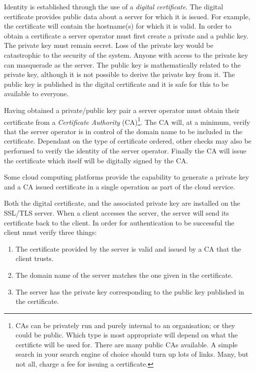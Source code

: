 Identity is established through the use of a \emph{digital certificate}. The 
digital certificate provides public data about a server for which it is issued. 
For example, the certificate will contain the hostname(s) for which it is 
valid. In order to obtain a certificate a server operator must first create a 
private and a public key. The private key must remain secret. Loss of the 
private key would be catastrophic to the security of the system. Anyone with 
access to the private key can masquerade as the server. The public key is 
mathematically related to the private key, although it is not possible to 
derive the private key from it. The public key is published in the digital 
certificate and it is safe for this to be available to everyone.

Having obtained a private/public key pair a server operator must obtain their
certificate from a \emph{Certificate Authority} (CA)\footnote{CAs can be
privately run and purely internal to an organisation; or they could be public.
Which type is most appropriate will depend on what the certificte will be used
for. There are many public CAs available. A simple search in your search engine
of choice should turn up lots of links. Many, but not all, charge a fee for
issuing a certificate.}. The CA will, at a minimum, verify that the server 
operator is in control of the domain name to be included in the certificate. 
Dependant on the type of certificate ordered, other checks may also be 
performed to verify the identity of the server operator. Finally the CA will 
issue the certificate which itself will be digitally signed by the CA.

Some cloud computing platforms provide the capability to generate a private key
and a CA issued certificate in a single operation as part of the cloud service.

Both the digital certificate, and the associated private key are installed on 
the SSL/TLS server. When a client accesses the server, the server will send 
its certificate back to the client. In order for authentication to be
successful the client must verify three things:
\begin{enumerate}
\item The certificate provided by the server is valid and issued by a CA that 
the client trusts.
\item The domain name of the server matches the one given in the certificate.
\item The server has the private key corresponding to the public key published 
in the certificate.
\end{enumerate}

